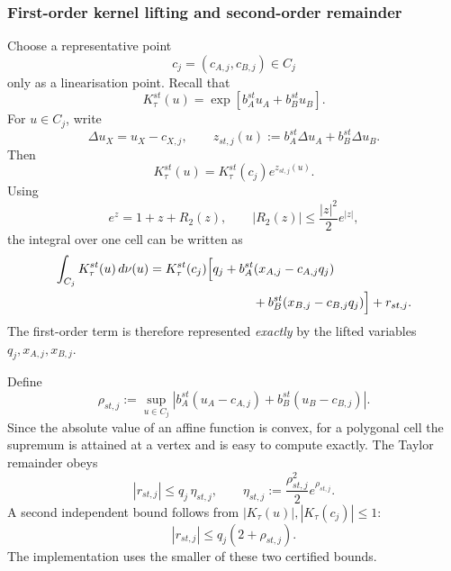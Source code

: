 \documentclass[11pt]{article}
\theoremstyle{remark}
\begin{document}
\subsubsection{First-order kernel lifting and second-order remainder}

Choose a representative point
\[
    c_j=(c_{A,j},c_{B,j})\in C_j
\]
only as a linearisation point.  Recall that
\[
    K_\tau^{st}(u)
    =
    \exp[
      b_A^{st}u_A+b_B^{st}u_B
    ].
\]
For \(u\in C_j\), write
\[
    \Delta u_X=u_X-c_{X,j},
    \qquad
    z_{st,j}(u)
    :=
    b_A^{st}\Delta u_A
    +
    b_B^{st}\Delta u_B.
\]
Then
\[
    K_\tau^{st}(u)
    =
    K_\tau^{st}(c_j)e^{z_{st,j}(u)}.
\]
Using
\[
    e^z=1+z+R_2(z),
    \qquad
    |R_2(z)|
    \le
    \frac{|z|^2}{2}e^{|z|},
\]
the integral over one cell can be written as
\begin{align}
    \int_{C_j}K_\tau^{st}(u)\,d\nu(u)
    &=
    K_\tau^{st}(c_j)
    \Big[
      q_j
      +
      b_A^{st}(x_{A,j}-c_{A,j}q_j)
      \nonumber\\
    &\hspace{29mm}
      +
      b_B^{st}(x_{B,j}-c_{B,j}q_j)
    \Big]
    +
    r_{st,j}.
    \label{eq:stage3-lifted-cell-decomposition}
\end{align}
The first-order term is therefore represented \emph{exactly} by the lifted
variables \(q_j,x_{A,j},x_{B,j}\).

Define
\begin{equation}
    \rho_{st,j}
    :=
    \sup_{u\in C_j}
    \left|
      b_A^{st}(u_A-c_{A,j})
      +
      b_B^{st}(u_B-c_{B,j})
    \right|.
    \label{eq:stage3-cell-bound}
\end{equation}
Since the absolute value of an affine function is convex, for a polygonal
cell the supremum is attained at a vertex and is easy to compute exactly.
The Taylor remainder obeys
\begin{equation}
    |r_{st,j}|
    \le
    q_j\,\eta_{st,j},
    \qquad
    \eta_{st,j}
    :=
    \frac{\rho_{st,j}^2}{2}e^{\rho_{st,j}}.
    \label{eq:stage3-second-order-remainder}
\end{equation}
A second independent bound follows from
\(|K_\tau(u)|,|K_\tau(c_j)|\le1\):
\[
    |r_{st,j}|
    \le
    q_j(2+\rho_{st,j}).
\]
The implementation uses the smaller of these two certified bounds.
\end{document}
